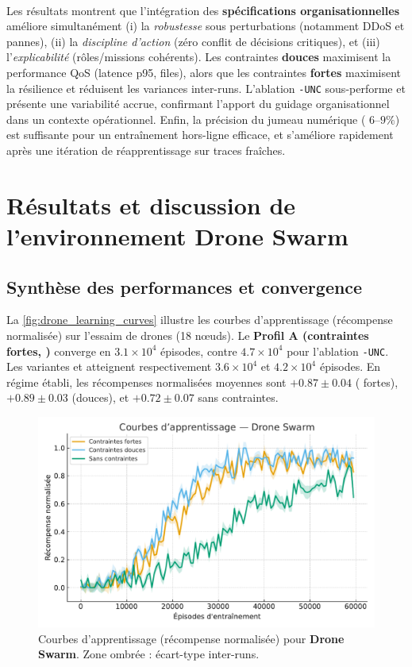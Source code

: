 \

Les résultats montrent que l’intégration des \textbf{spécifications organisationnelles} améliore simultanément (i) la \emph{robustesse} sous perturbations (notamment DDoS et pannes), (ii) la \emph{discipline d’action} (zéro conflit de décisions critiques), et (iii) l’\emph{explicabilité} (rôles/missions cohérents).
Les contraintes \textbf{douces} maximisent la performance QoS (latence p95, files), alors que les contraintes \textbf{fortes} maximisent la résilience et réduisent les variances inter-runs.
L’ablation \texttt{-UNC} sous-performe et présente une variabilité accrue, confirmant l’apport du guidage organisationnel dans un contexte opérationnel.
Enfin, la précision du jumeau numérique ( $6$--$9\%$) est suffisante pour un entraînement hors-ligne efficace, et s’améliore rapidement après une itération de réapprentissage sur traces fraîches.


\section{Résultats et discussion de l'environnement \textbf{Drone Swarm}}\label{sec:results_and_discussion_drone_swarm}

\subsection*{Synthèse des performances et convergence}

La \autoref{fig:drone_learning_curves} illustre les courbes d’apprentissage (récompense normalisée) sur l’essaim de drones (18 nœuds).
Le \textbf{Profil A (contraintes fortes, )} converge en $3.1\times 10^4$ épisodes, contre $4.7\times 10^4$ pour l’ablation \texttt{-UNC}.
Les variantes  et  atteignent respectivement $3.6\times 10^4$ et $4.2\times 10^4$ épisodes.
En régime établi, les récompenses normalisées moyennes sont $+0.87 \pm 0.04$ ( fortes), $+0.89 \pm 0.03$ (douces), et $+0.72 \pm 0.07$ sans contraintes.

\begin{figure}[h!]
  \centering
  \includegraphics[width=0.75\linewidth]{figures/results_drone_learning.pdf}
  \caption{Courbes d’apprentissage (récompense normalisée) pour \textbf{Drone Swarm}. Zone ombrée : écart-type inter-runs.}
  \label{fig:drone_learning_curves}
\end{figure}


